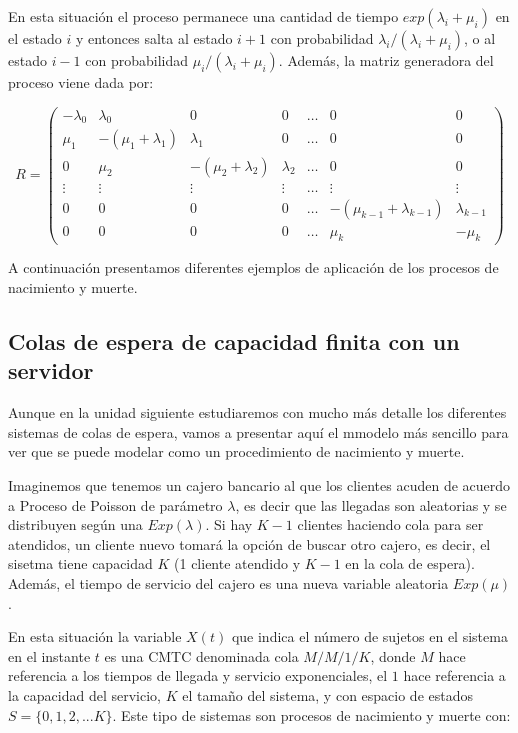 \documentclass[
]{book}
\theoremstyle{definition}
\theoremstyle{definition}
\theoremstyle{definition}
\theoremstyle{definition}
\theoremstyle{remark}
\begin{document}
En esta situación el proceso permanece una cantidad de tiempo \(exp(\lambda_i + \mu_i)\) en el estado \(i\) y entonces salta al estado \(i+1\) con probabilidad \(\lambda_i/(\lambda_i + \mu_i)\), o al estado \(i-1\) con probabilidad \(\mu_i/(\lambda_i + \mu_i)\). Además, la matriz generadora del proceso viene dada por:

\[R = 
\begin{pmatrix}
- \lambda_0& \lambda_0 & 0 & 0 & \ldots & 0 & 0 \\
\mu_1 & -(\mu_1 + \lambda_1) & \lambda_1 & 0 & \ldots & 0 & 0 \\
0 & \mu_2 & -(\mu_2 + \lambda_2) & \lambda_2 & \ldots & 0 & 0 \\
\vdots & \vdots & \vdots & \vdots & \ldots & \vdots & \vdots \\
0 & 0 & 0 & 0 & \ldots & -(\mu_{k-1} + \lambda_{k-1}) & \lambda_{k-1} \\
0 & 0 & 0 & 0 & \ldots & \mu_k & -\mu_k
\end{pmatrix} \]

A continuación presentamos diferentes ejemplos de aplicación de los procesos de nacimiento y muerte.

\hypertarget{colas-de-espera-de-capacidad-finita-con-un-servidor}{%
\subsection{Colas de espera de capacidad finita con un servidor}\label{colas-de-espera-de-capacidad-finita-con-un-servidor}}

Aunque en la unidad siguiente estudiaremos con mucho más detalle los diferentes sistemas de colas de espera, vamos a presentar aquí el mmodelo más sencillo para ver que se puede modelar como un procedimiento de nacimiento y muerte.

Imaginemos que tenemos un cajero bancario al que los clientes acuden de acuerdo a Proceso de Poisson de parámetro \(\lambda\), es decir que las llegadas son aleatorias y se distribuyen según una \(Exp(\lambda)\). Si hay \(K-1\) clientes haciendo cola para ser atendidos, un cliente nuevo tomará la opción de buscar otro cajero, es decir, el sisetma tiene capacidad \(K\) (1 cliente atendido y \(K-1\) en la cola de espera). Además, el tiempo de servicio del cajero es una nueva variable aleatoria \(Exp(\mu)\).

En esta situación la variable \(X(t)\) que indica el número de sujetos en el sistema en el instante \(t\) es una CMTC denominada cola \(M/M/1/K\), donde \(M\) hace referencia a los tiempos de llegada y servicio exponenciales, el \(1\) hace referencia a la capacidad del servicio, \(K\) el tamaño del sistema, y con espacio de estados \(S = \{0, 1, 2,...K \}\). Este tipo de sistemas son procesos de nacimiento y muerte con:
\end{document}

